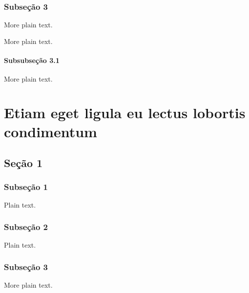 \documentclass[twoside,openright,a4paper]{abntex2}
\begin{document}
\subsection{Subseção 3}

More plain text.

\lipsum[16-20]

More plain text.

\subsubsection{Subsubseção 3.1}

More plain text.

\lipsum[21-25]




\chapter{Etiam eget ligula eu lectus lobortis condimentum}

\lipsum[1-3]

\section{Seção 1}

\lipsum[4-5]

\subsection{Subseção 1}

Plain text.

\lipsum[6-10]

\subsection{Subseção 2}

Plain text.

\lipsum[11-15]

\subsection{Subseção 3}

More plain text.

\lipsum[16-17]
\end{document}
